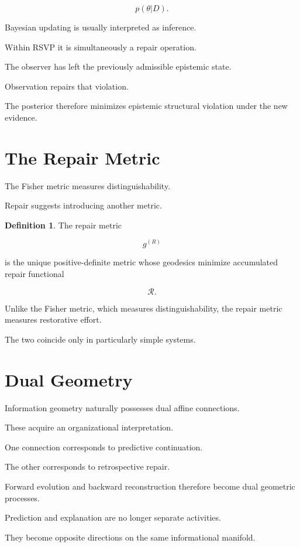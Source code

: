 \documentclass[11pt,oneside]{book}
\numberwithin{equation}{chapter}
\theoremstyle{definition}
\newtheorem{definition}{Definition}[chapter]
\theoremstyle{plain}
\begin{document}
\[
p(\theta|D).
\]

Bayesian updating is usually interpreted as inference.

Within RSVP it is simultaneously a repair operation.

The observer has left the previously admissible epistemic state.

Observation repairs that violation.

The posterior therefore minimizes epistemic structural violation under the
new evidence.

\section{The Repair Metric}

The Fisher metric measures distinguishability.

Repair suggests introducing another metric.

\begin{definition}

The repair metric

\[
g^{(R)}
\]

is the unique positive-definite metric whose geodesics minimize accumulated
repair functional

\[
\mathcal R.
\]

\end{definition}

Unlike the Fisher metric, which measures distinguishability, the repair
metric measures restorative effort.

The two coincide only in particularly simple systems.

\section{Dual Geometry}

Information geometry naturally possesses dual affine connections.

These acquire an organizational interpretation.

One connection corresponds to predictive continuation.

The other corresponds to retrospective repair.

Forward evolution and backward reconstruction therefore become dual
geometric processes.

Prediction and explanation are no longer separate activities.

They become opposite directions on the same informational manifold.
\end{document}
